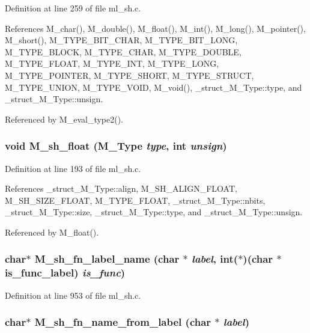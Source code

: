 Definition at line 259 of file ml\_\-sh.c.

References M\_\-char(), M\_\-double(), M\_\-float(), M\_\-int(), M\_\-long(), M\_\-pointer(), M\_\-short(), M\_\-TYPE\_\-BIT\_\-CHAR, M\_\-TYPE\_\-BIT\_\-LONG, M\_\-TYPE\_\-BLOCK, M\_\-TYPE\_\-CHAR, M\_\-TYPE\_\-DOUBLE, M\_\-TYPE\_\-FLOAT, M\_\-TYPE\_\-INT, M\_\-TYPE\_\-LONG, M\_\-TYPE\_\-POINTER, M\_\-TYPE\_\-SHORT, M\_\-TYPE\_\-STRUCT, M\_\-TYPE\_\-UNION, M\_\-TYPE\_\-VOID, M\_\-void(), \_\-struct\_\-M\_\-Type::type, and \_\-struct\_\-M\_\-Type::unsign.

Referenced by M\_\-eval\_\-type2().
\subsubsection{\setlength{\rightskip}{0pt plus 5cm}void M\_\-sh\_\-float (\bf{M\_\-Type} {\em type}, int {\em unsign})}\label{m__sh_8h_435788f46e0ae40e29fb2a08d0e5424b}




Definition at line 193 of file ml\_\-sh.c.

References \_\-struct\_\-M\_\-Type::align, M\_\-SH\_\-ALIGN\_\-FLOAT, M\_\-SH\_\-SIZE\_\-FLOAT, M\_\-TYPE\_\-FLOAT, \_\-struct\_\-M\_\-Type::nbits, \_\-struct\_\-M\_\-Type::size, \_\-struct\_\-M\_\-Type::type, and \_\-struct\_\-M\_\-Type::unsign.

Referenced by M\_\-float().
\subsubsection{\setlength{\rightskip}{0pt plus 5cm}char$\ast$ M\_\-sh\_\-fn\_\-label\_\-name (char $\ast$ {\em label}, int($\ast$)(char $\ast$is\_\-func\_\-label) {\em is\_\-func})}\label{m__sh_8h_17526deefd8f7a8b2003447c631246c2}




Definition at line 953 of file ml\_\-sh.c.
\subsubsection{\setlength{\rightskip}{0pt plus 5cm}char$\ast$ M\_\-sh\_\-fn\_\-name\_\-from\_\-label (char $\ast$ {\em label})}\label{m__sh_8h_d02080c87f351e3b4c285e437912a591}




